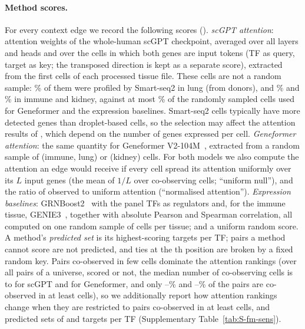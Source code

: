 \paragraph{Method scores.}
For every context edge we record the following scores ().
\emph{scGPT attention}: attention weights of the whole-human scGPT checkpoint, averaged over all layers and heads and over the cells in which both genes are input tokens (TF as query, target as key; the transposed direction is kept as a separate score), extracted from the first \nScgptCells{} cells of each processed tissue file. These cells are not a random sample: \nScgptSmartPctLung{}\% of them were profiled by Smart-seq2 in lung (from \nScgptDonorsLung{} donors), and \nScgptSmartPctImm{}\% and \nScgptSmartPctKid{}\% in immune and kidney, against at most \nOtherSmartPctMax{}\% of the randomly sampled cells used for Geneformer and the expression baselines. Smart-seq2 cells typically have more detected genes than droplet-based cells, so the selection may affect the attention results of , which depend on the number of genes expressed per cell.
\emph{Geneformer attention}: the same quantity for Geneformer V2-104M~\citep{chen2026geneformer}, extracted from a random sample of \nGfCellsImmLung{} (immune, lung) or \nGfCellsKid{} (kidney) cells.
For both models we also compute the attention an edge would receive if every cell spread its attention uniformly over its $L$ input genes (the mean of $1/L$ over co-observing cells; ``uniform null''), and the ratio of observed to uniform attention (``normalised attention'').
\emph{Expression baselines}: GRNBoost2~\citep{moerman2019grnboost2} with the panel TFs as regulators and, for the immune tissue, GENIE3~\citep{huynh2010inferring}, together with absolute Pearson and Spearman correlation, all computed on one random sample of \nExprCells{} cells per tissue; and a uniform random score.
A method's \emph{predicted set} is its \nTopK{} highest-scoring targets per TF; pairs a method cannot score are not predicted, and ties at the \nTopK{}th position are broken by a fixed random key.
Pairs co-observed in few cells dominate the attention rankings (over all pairs of a universe, scored or not, the median number of co-observing cells is \nCoobsScMin{} to \nCoobsScMax{} for scGPT and \nCoobsGfMax{} for Geneformer, and only \nCoobsFiveScPctMin{}--\nCoobsFiveScPctMax{}\% and \nCoobsFiveGfPctMin{}--\nCoobsFiveGfPctMax{}\% of the pairs are co-observed in at least \nFmMinCoobs{} cells), so we additionally report how attention rankings change when they are restricted to pairs co-observed in at least \nFmMinCoobs{} cells, and predicted sets of \nTopKSensLo{} and \nTopKSensHi{} targets per TF (Supplementary Table~\ref{tab:S-fm-sens}).

